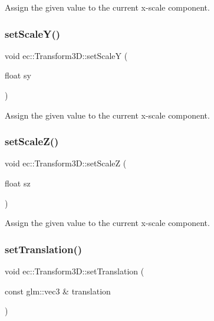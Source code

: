 Assign the given value to the current x-\/scale component. \mbox{\label{classec_1_1_transform3_d_a599ea97d84a88467abec94a30339f73e}} 
\subsubsection{\texorpdfstring{set\+Scale\+Y()}{setScaleY()}}
{\footnotesize\ttfamily void ec\+::\+Transform3\+D\+::set\+ScaleY (\begin{DoxyParamCaption}\item[{float}]{sy }\end{DoxyParamCaption})}

Assign the given value to the current x-\/scale component. \mbox{\label{classec_1_1_transform3_d_a1a71c829c953e5585623696fd7a4624d}} 
\subsubsection{\texorpdfstring{set\+Scale\+Z()}{setScaleZ()}}
{\footnotesize\ttfamily void ec\+::\+Transform3\+D\+::set\+ScaleZ (\begin{DoxyParamCaption}\item[{float}]{sz }\end{DoxyParamCaption})}

Assign the given value to the current x-\/scale component. \mbox{\label{classec_1_1_transform3_d_a2866183fe28eb5e5360d156830b00655}} 
\subsubsection{\texorpdfstring{set\+Translation()}{setTranslation()}\hspace{0.1cm}{\footnotesize\ttfamily [1/2]}}
{\footnotesize\ttfamily void ec\+::\+Transform3\+D\+::set\+Translation (\begin{DoxyParamCaption}\item[{const glm\+::vec3 \&}]{translation }\end{DoxyParamCaption})}

